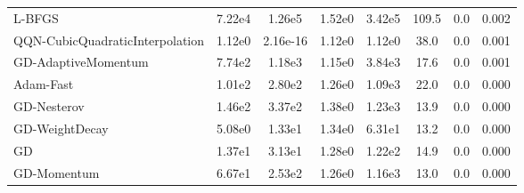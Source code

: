 \documentclass{article}
\begin{document}
\begin{table}[htbp]
{\begin{tabular}{p{2.5cm}*{7}{c}}
L-BFGS & 7.22e4 & 1.26e5 & 1.52e0 & 3.42e5 & 109.5 & 0.0 & 0.002 \\
QQN-CubicQuadraticInterpolation & 1.12e0 & 2.16e-16 & 1.12e0 & 1.12e0 & 38.0 & 0.0 & 0.001 \\
GD-AdaptiveMomentum & 7.74e2 & 1.18e3 & 1.15e0 & 3.84e3 & 17.6 & 0.0 & 0.001 \\
Adam-Fast & 1.01e2 & 2.80e2 & 1.26e0 & 1.09e3 & 22.0 & 0.0 & 0.000 \\
GD-Nesterov & 1.46e2 & 3.37e2 & 1.38e0 & 1.23e3 & 13.9 & 0.0 & 0.000 \\
GD-WeightDecay & 5.08e0 & 1.33e1 & 1.34e0 & 6.31e1 & 13.2 & 0.0 & 0.000 \\
GD & 1.37e1 & 3.13e1 & 1.28e0 & 1.22e2 & 14.9 & 0.0 & 0.000 \\
GD-Momentum & 6.67e1 & 2.53e2 & 1.26e0 & 1.16e3 & 13.0 & 0.0 & 0.000 \\
\bottomrule
\end{tabular}
}
\end{table}
\end{document}

